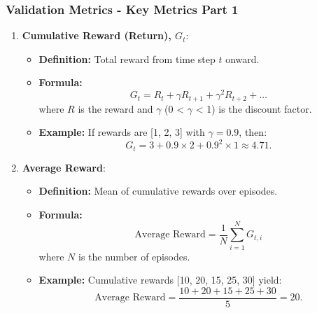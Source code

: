 \documentclass[aspectratio=169]{beamer}
\begin{document}
\begin{frame}[fragile]
    \frametitle{Validation Metrics - Key Metrics Part 1}
    \begin{enumerate}
        \item \textbf{Cumulative Reward (Return), \(G_t\)}:
        \begin{itemize}
            \item \textbf{Definition:} Total reward from time step \(t\) onward.
            \item \textbf{Formula:}
            \begin{equation}
                G_t = R_t + \gamma R_{t+1} + \gamma^2 R_{t+2} + \ldots
            \end{equation}
            where \(R\) is the reward and \(\gamma\) (0 < \(\gamma\) < 1) is the discount factor.
            \item \textbf{Example:} If rewards are [1, 2, 3] with \(\gamma = 0.9\), then:
            \begin{equation}
                G_t = 3 + 0.9 \times 2 + 0.9^2 \times 1 \approx 4.71.
            \end{equation}
        \end{itemize}

        \item \textbf{Average Reward}:
        \begin{itemize}
            \item \textbf{Definition:} Mean of cumulative rewards over episodes.
            \item \textbf{Formula:}
            \begin{equation}
                \text{Average Reward} = \frac{1}{N} \sum_{i=1}^{N} G_{t,i}
            \end{equation}
            where \(N\) is the number of episodes.
            \item \textbf{Example:} Cumulative rewards [10, 20, 15, 25, 30] yield:
            \begin{equation}
                \text{Average Reward} = \frac{10 + 20 + 15 + 25 + 30}{5} = 20.
            \end{equation}
        \end{itemize}
    \end{enumerate}
\end{frame}
\end{document}
